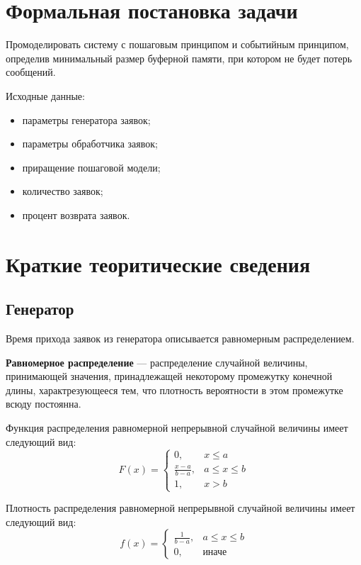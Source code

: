 \section*{Формальная постановка задачи}

Промоделировать систему с пошаговым принципом и событийным принципом, определив минимальный размер буферной памяти, при котором не будет потерь сообщений.

Исходные данные:
\begin{itemize}
	\item параметры генератора заявок;
	\item параметры обработчика заявок;
	\item приращение пошаговой модели;
	\item количество заявок;
	\item процент возврата заявок.
\end{itemize}

\section*{Краткие теоритические сведения}

\subsection*{Генератор}

Время прихода заявок из генератора описывается равномерным распределением.

\textbf{Равномерное распределение} --- распределение случайной величины, принимающей значения, принадлежащей некоторому промежутку конечной длины, характрезующееся тем, что плотность вероятности в этом промежутке всюду постоянна.

Функция распределения равномерной непрерывной случайной величины имеет следующий вид: 
\begin{equation*}
	F(x) = \begin{cases}
		0, & x \leq a \\
		\frac{x-a}{b-a}, & a \leq x \leq b \\
		1, & x > b
	\end{cases}
\end{equation*}

Плотность распределения равномерной непрерывной случайной величины имеет следующий вид:
\begin{equation*}
	f(x) = \begin{cases}
		\frac{1}{b-a}, & a \leq x \leq b \\
		0, & \text{иначе}
	\end{cases}
\end{equation*}

